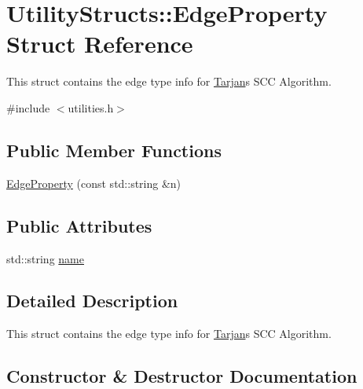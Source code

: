 \hypertarget{struct_utility_structs_1_1_edge_property}{}\section{Utility\+Structs\+:\+:Edge\+Property Struct Reference}
\label{struct_utility_structs_1_1_edge_property}


This struct contains the edge type info for \hyperlink{class_tarjan}{Tarjan}\textquotesingle{}s S\+CC Algorithm.  




{\ttfamily \#include $<$utilities.\+h$>$}

\subsection*{Public Member Functions}
\begin{DoxyCompactItemize}
\item 
\hyperlink{struct_utility_structs_1_1_edge_property_a823e9fa8af1aba8278c8c06f67e70073}{Edge\+Property} (const std\+::string \&n)
\end{DoxyCompactItemize}
\subsection*{Public Attributes}
\begin{DoxyCompactItemize}
\item 
std\+::string \hyperlink{struct_utility_structs_1_1_edge_property_a0701d898f719b1efbf795d80f503de81}{name}
\end{DoxyCompactItemize}


\subsection{Detailed Description}
This struct contains the edge type info for \hyperlink{class_tarjan}{Tarjan}\textquotesingle{}s S\+CC Algorithm. 

\subsection{Constructor \& Destructor Documentation}
\mbox{\label{struct_utility_structs_1_1_edge_property_a823e9fa8af1aba8278c8c06f67e70073}} 
